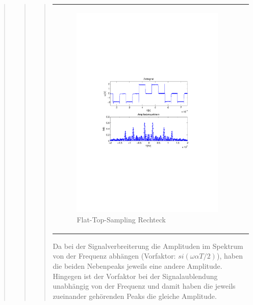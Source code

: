\begin{quote}
\begin{quote}
\begin{quote}
\begin{center}
\begin{tabular}{ll}
                \begin{minipage}{0.6\textwidth}
                    \begin{figure}[H]
                        \includegraphics[scale=0.7, trim = 35mm 100mm 35mm 95mm, clip]{Bilder/flatskizze}
                       \caption{Flat-Top-Sampling Rechteck}
		              \label{fig:flatrec}
                    \end{figure}
                \end{minipage}
            
            \end{tabular}
            \end{center}
            
            Da bei der Signalverbreiterung die Amplituden im Spektrum von der Frequenz abhängen (Vorfaktor: $si(\omega
             \alpha T/2)$), haben die beiden Nebenpeaks jeweils eine andere Amplitude. Hingegen ist der Vorfaktor bei
             der Signalaublendung unabhängig von der Frequenz und damit haben die jeweils zueinander
             gehörenden Peaks die gleiche Amplitude.
             

\end{quote}
\end{quote}
\end{quote}
